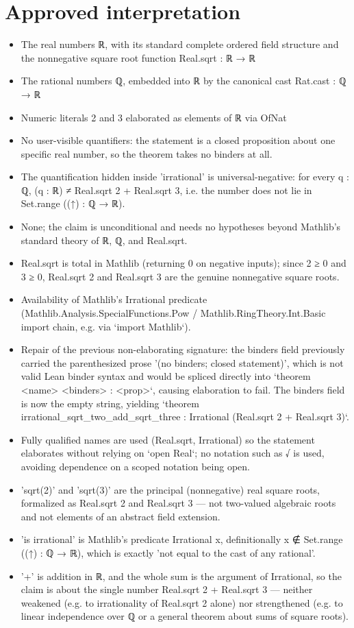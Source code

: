 \documentclass[11pt]{article}
\begin{document}
\section*{Approved interpretation}
\begin{itemize}
\item The real numbers ℝ, with its standard complete ordered field structure and the nonnegative square root function Real.sqrt : ℝ → ℝ
\item The rational numbers ℚ, embedded into ℝ by the canonical cast Rat.cast : ℚ → ℝ
\item Numeric literals 2 and 3 elaborated as elements of ℝ via OfNat
\item No user-visible quantifiers: the statement is a closed proposition about one specific real number, so the theorem takes no binders at all.
\item The quantification hidden inside 'irrational' is universal-negative: for every q : ℚ, (q : ℝ) ≠ Real.sqrt 2 + Real.sqrt 3, i.e. the number does not lie in Set.range ((↑) : ℚ → ℝ).
\item None; the claim is unconditional and needs no hypotheses beyond Mathlib's standard theory of ℝ, ℚ, and Real.sqrt.
\item Real.sqrt is total in Mathlib (returning 0 on negative inputs); since 2 ≥ 0 and 3 ≥ 0, Real.sqrt 2 and Real.sqrt 3 are the genuine nonnegative square roots.
\item Availability of Mathlib's Irrational predicate (Mathlib.Analysis.SpecialFunctions.Pow / Mathlib.RingTheory.Int.Basic import chain, e.g. via `import Mathlib`).
\item Repair of the previous non-elaborating signature: the binders field previously carried the parenthesized prose '(no binders; closed statement)', which is not valid Lean binder syntax and would be spliced directly into `theorem <name> <binders> : <prop>`, causing elaboration to fail. The binders field is now the empty string, yielding `theorem irrational\_sqrt\_two\_add\_sqrt\_three : Irrational (Real.sqrt 2 + Real.sqrt 3)`.
\item Fully qualified names are used (Real.sqrt, Irrational) so the statement elaborates without relying on `open Real`; no notation such as √ is used, avoiding dependence on a scoped notation being open.
\item 'sqrt(2)' and 'sqrt(3)' are the principal (nonnegative) real square roots, formalized as Real.sqrt 2 and Real.sqrt 3 — not two-valued algebraic roots and not elements of an abstract field extension.
\item 'is irrational' is Mathlib's predicate Irrational x, definitionally x ∉ Set.range ((↑) : ℚ → ℝ), which is exactly 'not equal to the cast of any rational'.
\item '+' is addition in ℝ, and the whole sum is the argument of Irrational, so the claim is about the single number Real.sqrt 2 + Real.sqrt 3 — neither weakened (e.g. to irrationality of Real.sqrt 2 alone) nor strengthened (e.g. to linear independence over ℚ or a general theorem about sums of square roots).
\end{itemize}
\end{document}
